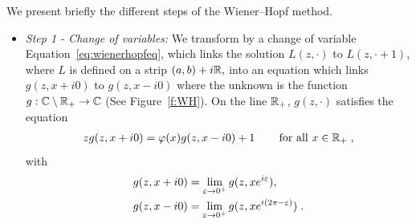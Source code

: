 
We present briefly the different steps of the Wiener--Hopf method. 

\begin{itemize}
    \item \textit{Step 1 - Change of variables:} We transform by a change of variable Equation~\eqref{eq:wienerhopfeq}, {\MD which links the solution $L(z,\cdot)$ to $L(z,\cdot +1)$,  where $L$ is defined on a strip $(a,b)+i\mathbb{R},$} into an equation {\MD which links $g(z,x+i0)$ to $g(z,x-i0)$} {\MD  where the unknown is} the function $g : \mathbb{C} \setminus \mathbb{R}_+ \to \mathbb{C}$  
     (See Figure~\ref{f:WH}).
    On the line $\mathbb{R}_+$, $g(z,\cdot)$ satisfies the equation
    \begin{align*}
        z g(z, x+i0) = \varphi(x)g(z, x-i0) + 1 \, \qquad \text{for all $x\in\mathbb{R}_+$}\; ,
    \end{align*}
    with 
    \begin{align*}
        g(z, x+i0) &= \lim_{\varepsilon\to 0^+}  g(z, xe^{i\varepsilon}),\\
        g(z, x-i0) &= \lim_{\varepsilon\to 0^+}  g(z, xe^{i(2\pi-\varepsilon)})\; . 
    \end{align*}
    \begin{figure}
\end{figure}
\end{itemize}

